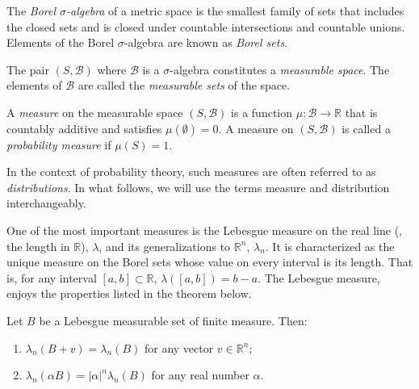 \begin{definition}
  The \emph{Borel $\sigma$-algebra} of a metric space is the smallest family
 of sets that includes  the closed sets and is closed under countable intersections and countable unions. Elements of the Borel
 $\sigma$-algebra are known as \emph{Borel sets}. 
\end{definition}

\begin{definition} 
  The pair $(S, \mathcal{B})$ where $\mathcal{B}$ is a $\sigma$-algebra constitutes a \emph{measurable space}. The elements of $\mathcal{B}$ are called  the \emph{measurable sets} of the space. 
\end{definition}



\begin{definition} 
  A  \emph{measure} on the measurable space $(S,\mathcal{B})$ is a function $\mu: \mathcal{B} \to  \mathbb{R} $ that is countably additive and satisfies $\mu(\emptyset)=0$. A measure  on $(S,\mathcal{B})$ is called a \emph{probability measure} if $\mu(S) = 1$.
\end{definition}

 In the context of probability theory, such measures are often referred to as \emph{distributions}. In what follows, we will use the terms measure and distribution interchangeably.

 

 One of the most important measures is the Lebesgue measure on the real line (\ie, the length in $\mathbb{R}$), $\lambda$, and its generalizations to $\mathbb{R}^n$,  $\lambda_n$.  It is characterized as the unique measure on the Borel sets whose value on every interval is its length. That is, for any interval $[a, b] \subset \mathbb{R}$,
$
\lambda([a, b]) = b - a.$ The Lebesgue measure, enjoys the properties listed in the theorem below.
\begin{theorem} \cite[Theorem 1.7.3]{bogachevMeasureTheory2007}\label{thm:props_lebesgue_meas}
  Let \( B \) be a Lebesgue measurable set of finite measure. Then:
\begin{enumerate}
  \item\( \lambda_n(B + v) = \lambda_n(B) \) for any vector \( v \in \mathbb{R}^n \);
  \item \( \lambda_n(\alpha B) = |\alpha|^n \lambda_n(B) \) for any real number \( \alpha \).
\end{enumerate}
\end{theorem}

